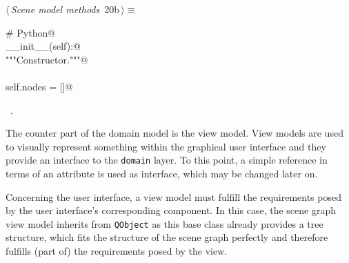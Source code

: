 \documentclass[
    a4paper,      %
    10pt,         %
    openright,    %
    notitlepage,  %
    parskip=half, %
]{scrreprt}       %
\theoremstyle{definition}                    %
\begin{document}
\begin{flushleft} \small
\begin{minipage}{\linewidth}\label{scrap11}\raggedright\small
{} $\langle\,${\itshape Scene model methods}\nobreak\ {\footnotesize {20b}}$\,\rangle\equiv$
\vspace{-1ex}
\begin{list}{}{} \item
\mbox{}\lstinline@# Python@\\
\mbox{}\lstinline@def __init__(self):@\\
\mbox{}\lstinline@    """Constructor."""@\\
\mbox{}\lstinline@@\\
\mbox{}\lstinline@    self.nodes = []@\\
\mbox{}\lstinline@@{\NWsep}
\end{list}
\vspace{-1.5ex}
\footnotesize
\begin{list}{}{\setlength{\itemsep}{-\parsep}\setlength{\itemindent}{-\leftmargin}}
\item \NWtxtMacroRefIn\ .

\item{}
\end{list}
\end{minipage}\vspace{4ex}
\end{flushleft}
The counter part of the domain model is the view model. View models are used to
visually represent something within the graphical user interface and they
provide an interface to the \verb+domain+ layer. To this point, a simple
reference in terms of an attribute is used as interface, which may be changed
later on.

Concerning the user interface, a view model must fulfill the requirements posed
by the user interface's corresponding component. In this case, the scene graph
view model inherits from \verb+QObject+ as this base class already provides a
tree structure, which fits the structure of the scene graph perfectly and
therefore fulfills (part of) the requirements posed by the view.
\end{document}
